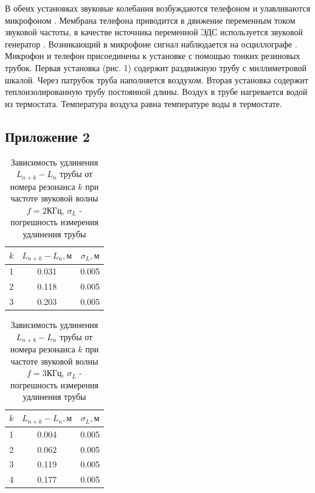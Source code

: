 В обеих установках звуковые колебания возбуждаются телефоном  и улавливаются микрофоном . Мембрана телефона приводится в движение переменным током звуковой частоты, в качестве источника переменной ЭДС используется звуковой генератор . Возникающий в микрофоне сигнал наблюдается на осциллографе . Микрофон и телефон присоединены к установке с помощью тонких резиновых трубок. Первая установка (рис. 1) содержит раздвижную трубу с миллиметровой шкалой. Через патрубок труба наполняется воздухом. Вторая установка содержит теплоизолированную трубу постоянной длины. Воздух в трубе нагревается водой из термостата. Температура воздуха равна температуре воды в термостате.

\subsection{Приложение 2} \label{Приложение 2}
\begin{table}[h]
    \centering
    \begin{tabular}{|c|c|c|}
    \hline
    $k$ & $L_{n+k} - L_n, \text{м}$ & $\sigma_L, \text{м}$  \\ \hline
    1   & 0.031                     & 0.005  \\ \hline
    2   & 0.118                     & 0.005  \\ \hline
    3   & 0.203                     & 0.005  \\ \hline
\end{tabular}
    \caption{Зависимость удлинения $L_{n+k} - L_n$ трубы от номера резонанса $k$ при частоте звуковой волны $f = 2\text{КГц}$, $\sigma_L$ - погрешность измерения удлинения трубы}
    \label{tab:t1}
\end{table}

\begin{table}[h]
    \centering
    \begin{tabular}{|c|c|c|}
    \hline
    $k$ & $L_{n+k} - L_n, \text{м}$ & $\sigma_L, \text{м}$  \\ \hline
    1   & 0.004                     & 0.005  \\ \hline
    2   & 0.062                     & 0.005  \\ \hline
    3   & 0.119                     & 0.005  \\ \hline
    4   & 0.177                     & 0.005  \\ \hline
\end{tabular}
    \caption{Зависимость удлинения $L_{n+k} - L_n$ трубы от номера резонанса $k$ при частоте звуковой волны $f = 3\text{КГц}$, $\sigma_L$ - погрешность измерения удлинения трубы}
    \label{tab:t2}
\end{table}


